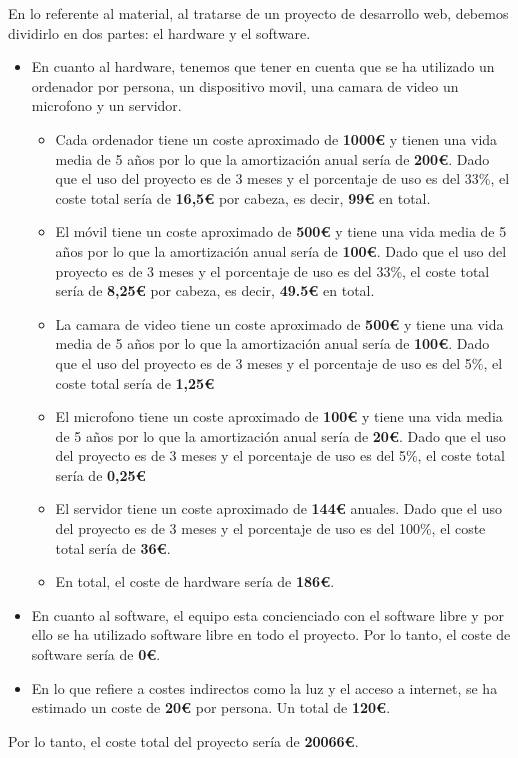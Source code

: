 \documentclass{report}
\begin{document}
{            En lo referente al material, al tratarse de un proyecto de desarrollo web, debemos dividirlo en dos partes: el hardware y el software.\\
            \begin{itemize}
                \item En cuanto al hardware, tenemos que tener en cuenta que se ha utilizado un ordenador por persona, un dispositivo movil, una camara de video un microfono y un servidor.
                \begin{itemize}
                    \item Cada ordenador tiene un coste aproximado de \textbf{1000€} y tienen una vida media de 5 años por lo que la amortización anual sería de \textbf{200€}. Dado que el uso del proyecto es de 3 meses y el porcentaje de uso es del 33\%, el coste total sería de \textbf{16,5€} por cabeza, es decir, \textbf{99€} en total.
                    \item El móvil tiene un coste aproximado de \textbf{500€} y tiene una vida media de 5 años por lo que la amortización anual sería de \textbf{100€}. Dado que el uso del proyecto es de 3 meses y el porcentaje de uso es del 33\%, el coste total sería de \textbf{8,25€} por cabeza, es decir, \textbf{49.5€} en total.
                    \item La camara de video tiene un coste aproximado de \textbf{500€} y tiene una vida media de 5 años por lo que la amortización anual sería de \textbf{100€}. Dado que el uso del proyecto es de 3 meses y el porcentaje de uso es del 5\%, el coste total sería de \textbf{1,25€}
                    \item El microfono tiene un coste aproximado de \textbf{100€} y tiene una vida media de 5 años por lo que la amortización anual sería de \textbf{20€}. Dado que el uso del proyecto es de 3 meses y el porcentaje de uso es del 5\%, el coste total sería de \textbf{0,25€}
                    \item El servidor tiene un coste aproximado de \textbf{144€} anuales. Dado que el uso del proyecto es de 3 meses y el porcentaje de uso es del 100\%, el coste total sería de \textbf{36€}.
                    \item En total, el coste de hardware sería de \textbf{186€}.
                \end{itemize}
                \item En cuanto al software, el equipo esta concienciado con el software libre y por ello se ha utilizado software libre en todo el proyecto. Por lo tanto, el coste de software sería de \textbf{0€}.
                \item En lo que refiere a costes indirectos como la luz y el acceso a internet, se ha estimado un coste de \textbf{20€} por persona. Un total de \textbf{120€}.
            \end{itemize}
            Por lo tanto, el coste total del proyecto sería de \textbf{20066€}.
        }
\end{document}
